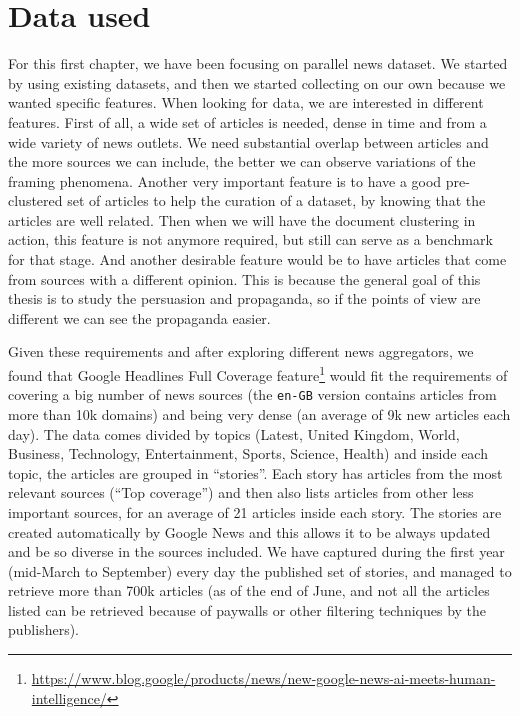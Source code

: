 \section{Data used}
For this first chapter, we have been focusing on parallel news dataset. We started by using existing datasets, and then we started collecting on our own because we wanted specific features.
When looking for data, we are interested in different features.
First of all, a wide set of articles is needed, dense in time and from a wide variety of news outlets. We need substantial overlap between articles and the more sources we can include, the better we can observe variations of the framing phenomena.
Another very important feature is to have a good pre-clustered set of articles to help the curation of a dataset, %
by knowing that the articles are well related.
Then when we will have the document clustering in action, this feature is not anymore required, but still can serve as a benchmark for that stage.
And another desirable feature would be to have articles that come from sources with a different opinion. %
This is because the general goal of this thesis is to study the persuasion and propaganda, so if the points of view are different we can see the propaganda easier.

Given these requirements and after exploring different news aggregators, we found that Google Headlines Full Coverage feature\footnote{\url{https://www.blog.google/products/news/new-google-news-ai-meets-human-intelligence/}} would fit the requirements of covering a big number of news sources (the \texttt{en-GB} version contains articles from more than 10k domains) and being very dense (an average of 9k new articles each day).
The data comes divided by topics (Latest, United Kingdom, World, Business, Technology, Entertainment, Sports, Science, Health) and inside each topic, the articles are grouped in ``stories''. Each story has articles from the most relevant sources (``Top coverage'') and then also lists articles from other less important sources, for an average of 21 articles inside each story.
The stories are created automatically by Google News and this allows it to be always updated and be so diverse in the sources included.
We have captured during the first year (mid-March to September) every day the published set of stories, and managed to retrieve more than 700k articles (as of the end of June, and not all the articles listed can be retrieved because of paywalls or other filtering techniques by the publishers).

